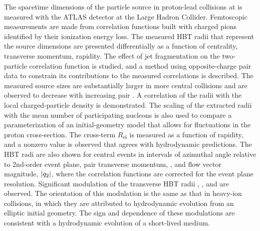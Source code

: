 The spacetime dimensions of the particle source in proton-lead collisions at \pPbenergy is measured with the ATLAS detector at the Large Hadron Collider.
Femtoscopic measurements are made from correlation functions built with charged pions identified by their ionization energy loss.
The measured HBT radii that represent the source dimensions are presented differentially as a function of centrality, transverse momentum, rapidity.
The effect of jet fragmentation on the two-particle correlation function is studied, and a method using opposite-charge pair data to constrain its contributions to the measured correlations is described.
The measured source sizes are substantially larger in more central collisions and are observed to decrease with increasing pair \kt.
A correlation of the radii with the local charged-particle density \dNdy is demonstrated.
The scaling of the extracted radii with the mean number of participating nucleons is also used to compare a parameterization of an initial-geometry model that allows for fluctuations in the proton cross-section.
The cross-term $R_\mathrm{ol}$ is measured as a function of rapidity, and a nonzero value is observed that agrees with hydrodynamic predictions.
The HBT radi are also shown for central events in intervals of azimuthal angle relative to 2nd-order event plane, pair transverse momentum, \kt, and flow vector magnitude, $|q_{2}|$, where the correlation functions are corrected for the event plane resolution.
Significant modulation of the transverse HBT radii \Rout, \Rside, and \Ros are observed.
The orientation of this modulation is the same as that in heavy-ion collisions, in which they are attributed to hydrodynamic evolution from an elliptic initial geometry.
The sign and \kt dependence of these modulations are consistent with a hydrodynamic evolution of a short-lived medium.
